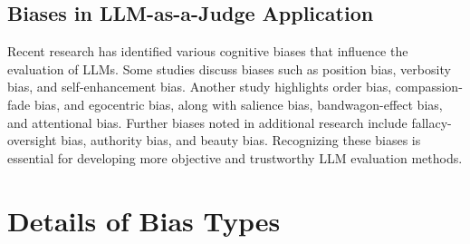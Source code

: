 \documentclass{article} %
\begin{document}
\subsection{Biases in LLM-as-a-Judge Application}
Recent research has identified various cognitive biases that influence the evaluation of LLMs. Some studies \citep{zheng2024judging,shi2024judgingjudgessystematicinvestigation,wang2023largelanguagemodelsfair} discuss biases such as position bias, verbosity bias, and self-enhancement bias. Another study \citep{koo2023benchmarkingcognitivebiaseslarge} highlights order bias, compassion-fade bias, and egocentric bias, along with salience bias, bandwagon-effect bias, and attentional bias. Further biases noted in additional research \citep{chen2024humansllmsjudgestudy,stureborg2024largelanguagemodelsinconsistent} include fallacy-oversight bias, authority bias, and beauty bias. Recognizing these biases is essential for developing more objective and trustworthy LLM evaluation methods. 


\section{Details of Bias Types}
\label{app:bias_type}
\end{document}
